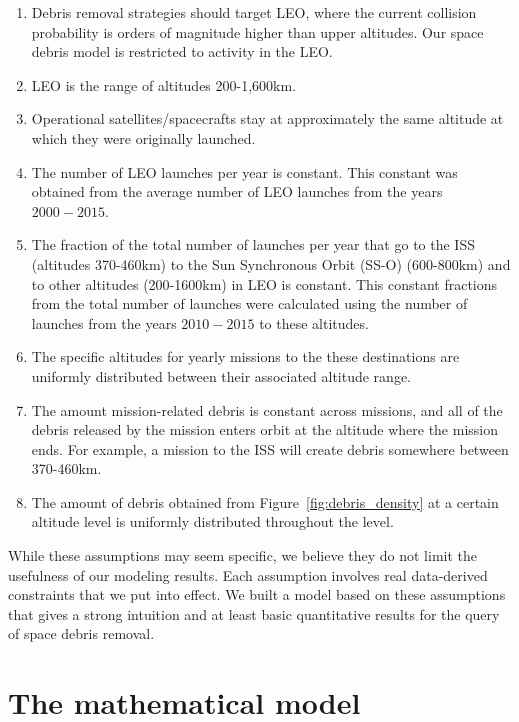 \documentclass[pre,12pt]{revtex4-1}
\begin{document}
\begin{enumerate}
  \item Debris removal strategies should target LEO, where the current collision probability is orders of magnitude higher than upper altitudes\cite{orbitalDebris}. Our space debris model is restricted to activity in the LEO.
  \item LEO is the range of altitudes 200-1,600km.
  \item Operational satellites/spacecrafts stay at approximately the same altitude at which they were originally launched.
  \item The number of LEO launches per year is constant. This constant was obtained from the average number of LEO launches from the years $2000-2015$.
  \item The fraction of the total number of launches per year that go to the ISS (altitudes 370-460km) to the Sun Synchronous Orbit (SS-O) (600-800km) and to other altitudes (200-1600km) in LEO is constant. This constant fractions from the total number of launches were calculated using the number of launches from the years $2010-2015$ to these altitudes.
  \item The specific altitudes for yearly missions to the these destinations are uniformly distributed between their associated altitude range.
  \item The amount mission-related debris is constant across missions, and all of the debris released by the mission enters orbit at the altitude where the mission ends. For example, a mission to the ISS will create debris somewhere between 370-460km.
  \item The amount of debris obtained from Figure~\ref{fig:debris_density} at a certain altitude level is uniformly distributed throughout the level.
\end{enumerate}


While these assumptions may seem specific, we believe they do not limit the usefulness of our modeling results. Each assumption involves real data-derived constraints that we put into effect. We built a model based on these assumptions that gives a strong intuition and at least basic quantitative results for the query of space debris removal.


\section{The mathematical model}\label{Model}
\end{document}
